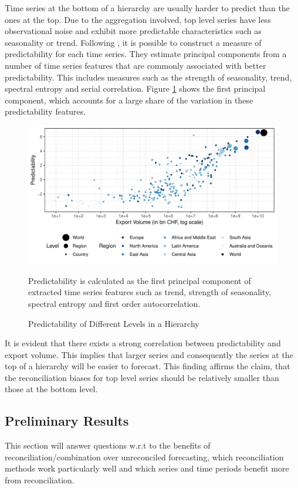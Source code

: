 \documentclass[a4paper,fleqn,11pt]{article}
\begin{document}
Time series at the bottom of a hierarchy are usually harder to predict than the ones at the top. Due to the aggregation involved, top level series have less observational noise and exhibit more predictable characteristics such as seasonality or trend. Following \cite{Kang2017}, it is possible to construct a measure of predictability for each time series. They estimate principal components from a number of time series features that are commonly associated with better predictability. This includes measures such as the strength of seasonality, trend, spectral entropy and serial correlation. Figure \ref{fig:feature} shows the first principal component, which accounts for a large share of the variation in these predictability features.
\begin{figure}[H]
	\includegraphics[width=\textwidth]{fig/fig_confetti}
	\caption{Predictability of Different Levels in a Hierarchy} \label{fig:feature}
	\footnotesize{Predictability is calculated as the first principal component of extracted time series features such as trend, strength of seasonality, spectral entropy and first order autocorrelation.}
\end{figure}
It is evident that there exists a strong correlation between predictability and export volume. This implies that larger series and consequently the series at the top of a hierarchy will be easier to forecast. This finding affirms the claim, that the reconciliation biases for top level series should be relatively smaller than those at the bottom level.

\clearpage

\subsection{Preliminary Results}
This section will answer questions w.r.t to the benefits of reconciliation/combination over unreconciled forecasting, which reconciliation methods work particularly well and which series and time periods benefit more from reconciliation.\\
 
\end{document}
